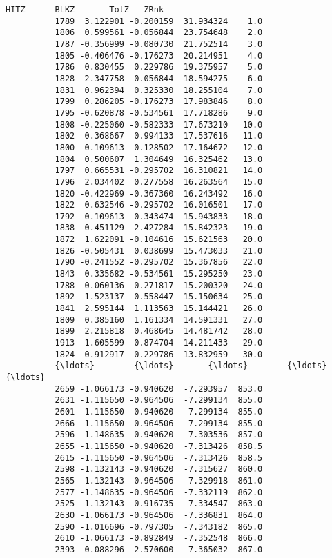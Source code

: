 \documentclass[11pt]{article}
\begin{document}
\begin{Verbatim}[commandchars=\\\{\}]
                    HITZ      BLKZ       TotZ   ZRnk  
          1789  3.122901 -0.200159  31.934324    1.0  
          1806  0.599561 -0.056844  23.754648    2.0  
          1787 -0.356999 -0.080730  21.752514    3.0  
          1805 -0.406476 -0.176273  20.214951    4.0  
          1786  0.830455  0.229786  19.375957    5.0  
          1828  2.347758 -0.056844  18.594275    6.0  
          1831  0.962394  0.325330  18.255104    7.0  
          1799  0.286205 -0.176273  17.983846    8.0  
          1795 -0.620878 -0.534561  17.718286    9.0  
          1808 -0.225060 -0.582333  17.673210   10.0  
          1802  0.368667  0.994133  17.537616   11.0  
          1800 -0.109613 -0.128502  17.164672   12.0  
          1804  0.500607  1.304649  16.325462   13.0  
          1797  0.665531 -0.295702  16.310821   14.0  
          1796  2.034402  0.277558  16.263564   15.0  
          1820 -0.422969 -0.367360  16.243492   16.0  
          1822  0.632546 -0.295702  16.016501   17.0  
          1792 -0.109613 -0.343474  15.943833   18.0  
          1838  0.451129  2.427284  15.842323   19.0  
          1872  1.622091 -0.104616  15.621563   20.0  
          1826 -0.505431  0.038699  15.473033   21.0  
          1790 -0.241552 -0.295702  15.367856   22.0  
          1843  0.335682 -0.534561  15.295250   23.0  
          1788 -0.060136 -0.271817  15.200320   24.0  
          1892  1.523137 -0.558447  15.150634   25.0  
          1841  2.595144  1.113563  15.144421   26.0  
          1809  0.385160  1.161334  14.591331   27.0  
          1899  2.215818  0.468645  14.481742   28.0  
          1913  1.605599  0.874704  14.211433   29.0  
          1824  0.912917  0.229786  13.832959   30.0  
          {\ldots}        {\ldots}       {\ldots}        {\ldots}    {\ldots}  
          2659 -1.066173 -0.940620  -7.293957  853.0  
          2631 -1.115650 -0.964506  -7.299134  855.0  
          2601 -1.115650 -0.940620  -7.299134  855.0  
          2666 -1.115650 -0.964506  -7.299134  855.0  
          2596 -1.148635 -0.940620  -7.303536  857.0  
          2655 -1.115650 -0.940620  -7.313426  858.5  
          2615 -1.115650 -0.964506  -7.313426  858.5  
          2598 -1.132143 -0.940620  -7.315627  860.0  
          2565 -1.132143 -0.964506  -7.329918  861.0  
          2577 -1.148635 -0.964506  -7.332119  862.0  
          2525 -1.132143 -0.916735  -7.334547  863.0  
          2630 -1.066173 -0.964506  -7.336831  864.0  
          2590 -1.016696 -0.797305  -7.343182  865.0  
          2610 -1.066173 -0.892849  -7.352548  866.0  
          2393  0.088296  2.570600  -7.365032  867.0  

\end{Verbatim}
\end{document}
